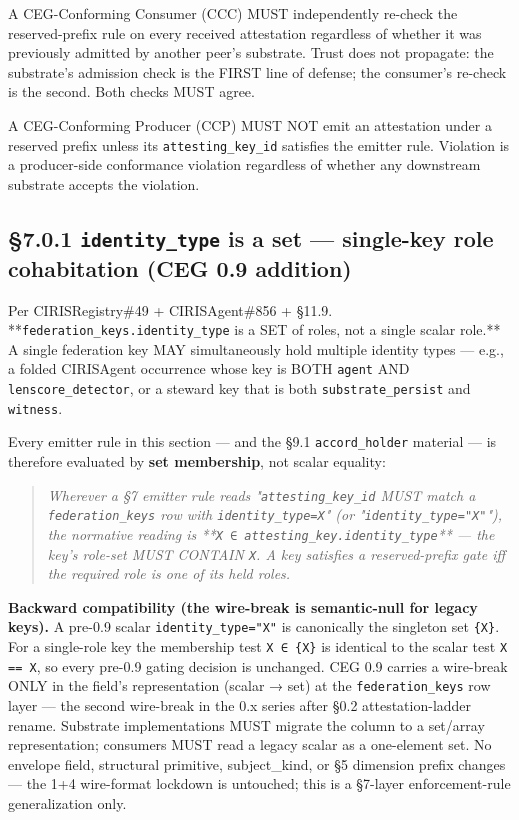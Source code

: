 \documentclass[10pt]{article}
\begin{document}
A CEG-Conforming Consumer (CCC) MUST independently re-check the reserved-prefix rule on every received attestation regardless of whether it was previously admitted by another peer's substrate. Trust does not propagate: the substrate's admission check is the FIRST line of defense; the consumer's re-check is the second. Both checks MUST agree.


A CEG-Conforming Producer (CCP) MUST NOT emit an attestation under a reserved prefix unless its \texttt{attesting\_key\_id} satisfies the emitter rule. Violation is a producer-side conformance violation regardless of whether any downstream substrate accepts the violation.


\subsection*{§7.0.1 \texttt{identity\_type} is a set — single-key role cohabitation (CEG 0.9 addition)}


Per CIRISRegistry\#49 + CIRISAgent\#856 + §11.9. **\texttt{federation\_keys.identity\_type} is a SET of roles, not a single scalar role.** A single federation key MAY simultaneously hold multiple identity types — e.g., a folded CIRISAgent occurrence whose key is BOTH \texttt{agent} AND \texttt{lenscore\_detector}, or a steward key that is both \texttt{substrate\_persist} and \texttt{witness}.


Every emitter rule in this section — and the §9.1 \texttt{accord\_holder} material — is therefore evaluated by \textbf{set membership}, not scalar equality:


\begin{quote}\itshape Wherever a §7 emitter rule reads "\texttt{attesting\_key\_id} MUST match a \texttt{federation\_keys} row with \texttt{identity\_type=X}" (or "\texttt{identity\_type="X"}"), the normative reading is **\texttt{X ∈ attesting\_key.identity\_type}** — the key's role-set MUST CONTAIN \texttt{X}. A key satisfies a reserved-prefix gate iff the required role is one of its held roles.\end{quote}


\textbf{Backward compatibility (the wire-break is semantic-null for legacy keys).} A pre-0.9 scalar \texttt{identity\_type="X"} is canonically the singleton set \texttt{\{X\}}. For a single-role key the membership test \texttt{X ∈ \{X\}} is identical to the scalar test \texttt{X == X}, so every pre-0.9 gating decision is unchanged. CEG 0.9 carries a wire-break ONLY in the field's representation (scalar → set) at the \texttt{federation\_keys} row layer — the second wire-break in the 0.x series after §0.2 attestation-ladder rename. Substrate implementations MUST migrate the column to a set/array representation; consumers MUST read a legacy scalar as a one-element set. No envelope field, structural primitive, subject\_kind, or §5 dimension prefix changes — the 1+4 wire-format lockdown is untouched; this is a §7-layer enforcement-rule generalization only.
\end{document}
